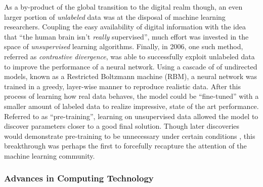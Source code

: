 As a by-product of the global transition to the digital realm though, an even larger portion of \emph{unlabeled} data was at the disposal of machine learning researchers.
Coupling the easy availability of digital information with the idea that ``the human brain isn't \emph{really} supervised'', much effort was invested in the space of \emph{unsupervised} learning algorithms. %
Finally, in 2006, one such method, referred as \emph{contrastive divergence}, was able to successfully exploit unlabeled data to improve the performance of a neural network.
Using a cascade of of undirected models, known as a Restricted Boltzmann machine (RBM), a neural network was trained in a greedy, layer-wise manner to reproduce realistic data.
After this process of learning how real data behaves, the model could be ``fine-tuned'' with a smaller amount of labeled data to realize impressive, state of the art performance.
Referred to as ``pre-training'', learning on unsupervised data allowed the model to discover parameters closer to a good final solution.
Though later discoveries would demonstrate pre-training to be unnecessary under certain conditions \cite{}, this breakthrough was perhaps the first to forcefully recapture the attention of the machine learning community.



\subsubsection{Advances in Computing Technology}
\label{subsubsec:hardware}

